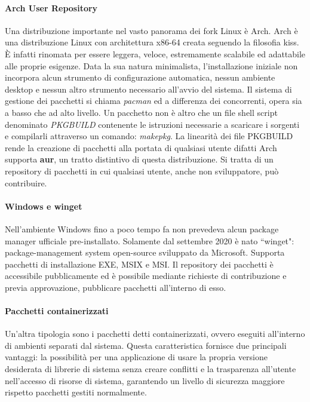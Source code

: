 \paragraph{Arch User Repository} Una distribuzione importante nel vasto panorama dei fork Linux è Arch. Arch è una distribuzione Linux con architettura x86-64 creata seguendo la filosofia \ac{kiss}. È infatti rinomata per essere leggera, veloce, estremamente scalabile ed adattabile alle proprie esigenze. Data la sua natura minimalista, l'installazione iniziale non incorpora alcun strumento di configurazione automatica, nessun ambiente desktop e nessun altro strumento necessario all'avvio del sistema. Il sistema di gestione dei pacchetti si chiama \textit{pacman} ed a differenza dei concorrenti, opera sia a basso che ad alto livello. Un pacchetto non è altro che un file shell script denominato \textit{PKGBUILD} contenente le istruzioni necessarie a scaricare i sorgenti e compilarli attraverso un comando: \textit{makepkg}. La linearità dei file PKGBUILD rende la creazione di pacchetti alla portata di qualsiasi utente difatti Arch supporta \textbf{\ac{aur}}, un tratto distintivo di questa distribuzione. Si tratta di un repository di pacchetti in cui qualsiasi utente, anche non sviluppatore, può contribuire.  

\paragraph{Windows e winget} Nell'ambiente Windows fino a poco tempo fa non prevedeva alcun package manager ufficiale pre-installato. Solamente dal settembre 2020 è nato ``winget": package-management system open-source sviluppato da Microsoft. Supporta pacchetti di installazione EXE, MSIX e MSI. Il repository dei pacchetti è accessibile pubblicamente ed è possibile mediante richieste di contribuzione e previa approvazione, pubblicare pacchetti all'interno di esso.

\paragraph{Pacchetti containerizzati} Un'altra tipologia sono i pacchetti detti containerizzati, ovvero eseguiti all'interno di ambienti separati dal sistema. Questa caratteristica fornisce due principali vantaggi: la possibilità per una applicazione di usare la propria versione desiderata di librerie di sistema senza creare conflitti e la trasparenza all'utente nell'accesso di risorse di sistema, garantendo un livello di sicurezza maggiore rispetto pacchetti gestiti normalmente.

